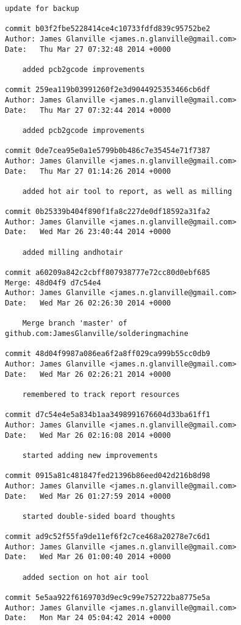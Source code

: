 \documentclass[a4paper,11pt]{article}  %
\begin{document}
\begin{lstlisting}[frame=single]
    update for backup

commit b03f2fbe5228414ce4c10733fdfd839c95752be2
Author: James Glanville <james.n.glanville@gmail.com>
Date:   Thu Mar 27 07:32:48 2014 +0000

    added pcb2gcode improvements

commit 259ea119b03991260f2e3d9044925353466cb6df
Author: James Glanville <james.n.glanville@gmail.com>
Date:   Thu Mar 27 07:32:44 2014 +0000

    added pcb2gcode improvements

commit 0de7cea95e0a1e5799b0b486c7e35454e71f7387
Author: James Glanville <james.n.glanville@gmail.com>
Date:   Thu Mar 27 01:14:26 2014 +0000

    added hot air tool to report, as well as milling

commit 0b25339b404f890f1fa8c227de0df18592a31fa2
Author: James Glanville <james.n.glanville@gmail.com>
Date:   Wed Mar 26 23:40:44 2014 +0000

    added milling andhotair

commit a60209a842c2cbff807938777e72cc80d0ebf685
Merge: 48d04f9 d7c54e4
Author: James Glanville <james.n.glanville@gmail.com>
Date:   Wed Mar 26 02:26:30 2014 +0000

    Merge branch 'master' of github.com:JamesGlanville/solderingmachine

commit 48d04f9987a086ea6f2a8ff029ca999b55cc0db9
Author: James Glanville <james.n.glanville@gmail.com>
Date:   Wed Mar 26 02:26:21 2014 +0000

    remembered to track report resources

commit d7c54e4e5a834b1aa3498991676604d33ba61ff1
Author: James Glanville <james.n.glanville@gmail.com>
Date:   Wed Mar 26 02:16:08 2014 +0000

    started adding new improvements

commit 0915a81c481847fed21396b86eed042d216b8d98
Author: James Glanville <james.n.glanville@gmail.com>
Date:   Wed Mar 26 01:27:59 2014 +0000

    started double-sided board thoughts

commit ad9c52f55fa9de11ef6f2c7ce468a20278e7c6d1
Author: James Glanville <james.n.glanville@gmail.com>
Date:   Wed Mar 26 01:00:40 2014 +0000

    added section on hot air tool

commit 5e5aa922f6169703d9ec9c99e752722ba8775e5a
Author: James Glanville <james.n.glanville@gmail.com>
Date:   Mon Mar 24 05:04:42 2014 +0000


\end{lstlisting}
\end{document}
